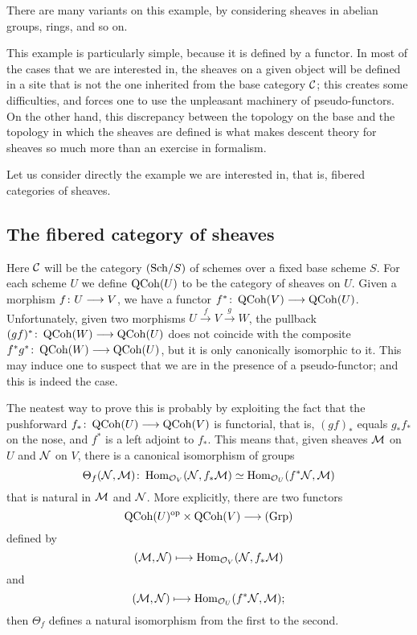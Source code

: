 \begin{3   FIBERED CATEGORIES}
\begin{3.2 Examples of fibered categories}
\begin{example}
\end{example}

There are many variants on this example, by considering sheaves in abelian groups, rings, and so on.

This example is particularly simple, because it is defined by a functor. In most of the cases that we are interested in, the sheaves on a given object will be defined in a site that is not the one inherited from the base category $\mathcal{C}$; this creates some difficulties, and forces one to use the unpleasant machinery of pseudo-functors. On the other hand, this discrepancy between the topology on the base and the topology in which the sheaves are defined is what makes descent theory for \qc sheaves so much more than an exercise in formalism.

Let us consider directly the example we are interested in, that is, fibered categories of \qc sheaves.

\subsection{The fibered category of \qc sheaves}
\label{subsec:fibered-quasi-coherent}
Here $\mathcal{C}$ will be the category $({\mathrm{Sch}/S})$ of schemes over a fixed base scheme $S$. For each scheme $U$ we define $\operatorname{QCoh}(U)$ to be the category of \qc sheaves on $U$. Given a morphism $f \colon U \arr V$, we have a functor $f^* \colon \qcoh V \arr \qcoh U$. Unfortunately, given two morphisms $U \xrightarrow{f} V \xrightarrow{g} W$, the pullback $(gf)^* \colon \qcoh W \arr \qcoh U$ does not coincide with the composite $f^*g^* \colon \qcoh W \arr \qcoh U$, but it is only  canonically isomorphic to it. This may induce one to suspect that we are in the presence of a pseudo-functor; and this is indeed the case.

The neatest way to prove this is probably by exploiting the fact that the pushforward $f_* \colon \qcoh U \arr \qcoh V$ is functorial, that is, $(gf)_*$ equals $g_* f_*$ on the nose, and $f^*$ is a left adjoint to $f_*$. This means that, given \qc sheaves $\mathcal{M}$ on $U$ and $\mathcal{N}$ on $V$, there is a canonical isomorphism of groups
   \[
   \Theta_f(\mathcal{N},\mathcal{M})\colon
   \operatorname{Hom}_{\mathcal{O}_V}(\mathcal{N}, f_*\mathcal{M}) \simeq
   \operatorname{Hom}_{\mathcal{O}_U}(f^* \mathcal{N}, \mathcal{M})
   \]
that is natural in $\mathcal{M}$ and $\mathcal{N}$. More explicitly, there are two functors
   \[
   \qcoh U\op \times \qcoh V \arr \catgrp
   \]
defined by
   \[
   (\mathcal{M},\mathcal{N}) \longmapsto
   \operatorname{Hom}_{\mathcal{O}_V}(\mathcal{N}, f_*\mathcal{M})
   \]
and
   \[
   (\mathcal{M},\mathcal{N}) \longmapsto
   \operatorname{Hom}_{\mathcal{O}_U}(f^* \mathcal{N}, \mathcal{M});
   \]
then $\Theta_f$ defines a natural isomorphism from the first to
the second.


\end{3.2 Examples of fibered categories}
\end{3   FIBERED CATEGORIES}

